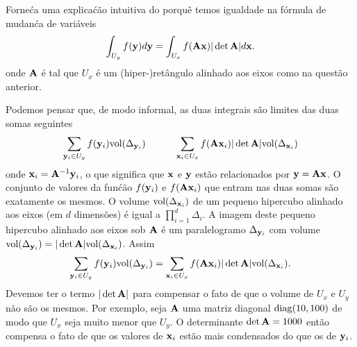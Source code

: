 \begin{exenumerate}
    \item Forne\'ca uma explica\'c\~ao intuitiva do porqu\^e temos igualdade na f\'ormula de mudan\'ca de vari\'aveis 
    \begin{equation} \int_{U_y} f(\mathbf{y})d\mathbf{y} = \int_{U_x} f(\mathbf{A} \mathbf{x}) |\det \mathbf{A}| d\mathbf{x}.
    \end{equation} onde $\mathbf{A}$ \'e tal que $U_x$ \'e um (hiper-)ret\^angulo alinhado aos eixos como na quest\~ao anterior.
    
    \begin{solution} Podemos pensar que, de modo informal, as duas integrais
        s\~ao limites das duas somas seguintes
        \begin{equation} \sum_{\mathbf{y}_i \in U_y}
            f(\mathbf{y}_i) \textrm{vol}(\Delta_{\mathbf{y}_i}) \quad \quad \quad \sum_{\mathbf{x}_i \in U_x}
            f(\mathbf{A} \mathbf{x}_i) |\det \mathbf{A}| \textrm{vol}(\Delta_{\mathbf{x}_i})
        \end{equation}
        onde $\mathbf{x}_i = \mathbf{A}^{-1} \mathbf{y}_i$, o que significa que $\mathbf{x}$ e $\mathbf{y}$ est\~ao relacionados
        por $\mathbf{y} = \mathbf{A} \mathbf{x}$. O conjunto de valores da fun\'c\~ao $f(\mathbf{y}_i)$ e $f(\mathbf{A} \mathbf{x}_i)$
        que entram nas duas somas s\~ao exatamente os mesmos. O volume
        $\textrm{vol}(\Delta_{\mathbf{x}_i})$ de um pequeno hipercubo alinhado aos eixos (em $d$
        dimens\~oes) \'e igual a $\prod_{i=1}^d \Delta_i$. A imagem deste pequeno
        hipercubo alinhado aos eixos sob $\mathbf{A}$ \'e um paralelogramo $\Delta_{\mathbf{y}_i}$
        com volume $\textrm{vol}(\Delta_{\mathbf{y}_i})= |\det \mathbf{A}|
        \textrm{vol}(\Delta_{\mathbf{x}_i})$. Assim
        \begin{equation}
            \sum_{\mathbf{y}_i \in U_y} f(\mathbf{y}_i) \textrm{vol}(\Delta_{\mathbf{y}_i}) = \sum_{\mathbf{x}_i \in U_x} f(\mathbf{A} \mathbf{x}_i) |\det \mathbf{A}| \textrm{vol}(\Delta_{\mathbf{x}_i}).
        \end{equation}
        Devemos ter o termo $|\det \mathbf{A}|$ para compensar o fato de que o volume de $U_x$ e $U_y$ n\~ao s\~ao os mesmos. Por exemplo, seja $\mathbf{A}$ uma matriz diagonal $\operatorname{diag}(10, 100)$ de modo que $U_x$ seja muito menor que $U_y$. O determinante $\det \mathbf{A} = 1000$ ent\~ao compensa o fato de que os valores de $\mathbf{x}_i$ est\~ao mais condensados do que os de $\mathbf{y}_i$.
    \end{solution}
    
\end{exenumerate}



